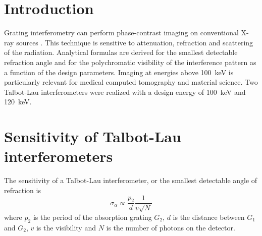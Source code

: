 \documentclass[a0,portrait]{a0poster}
\newcommand{\G}[1]{\ensuremath{G_{#1}}}
\begin{document}

\begin{multicols}{2} %


\color{Navy} %

\thispagestyle{empty}
\section*{Introduction}
Grating interferometry \cite{David2002} can perform phase-contrast imaging on
    conventional X-ray sources \cite{Pfeiffer2006}. This technique is sensitive to attenuation,
    refraction and scattering of the radiation.
    Analytical formulas are derived for the smallest detectable refraction
    angle and for the polychromatic visibility of the interference pattern
    as a function of the design parameters.
    Imaging at energies above \SI{100}{\kilo\eV}
    is particularly relevant for medical computed tomography and material
    science.
    Two Talbot-Lau interferometers were realized with 
    a design energy of \SI{100}{\kilo\eV} and
    \SI{120}{\kilo\eV}.


\color{DarkSlateGray} %

\section*{Sensitivity of Talbot-Lau interferometers}
The sensitivity of a Talbot-Lau interferometer, or the smallest detectable
angle of refraction\cite{Modregger2011} is
\begin{equation*}
    \sigma_\alpha \propto \frac{p_2}{d}\frac{1}{v\sqrt{N}}
\end{equation*}
where $p_2$ is the period of the absorption grating \G{2}, $d$ is the
distance between \G{1} and \G{2}, $v$ is the visibility and $N$ is the
number of photons on the detector.


\end{multicols}
\end{document}
